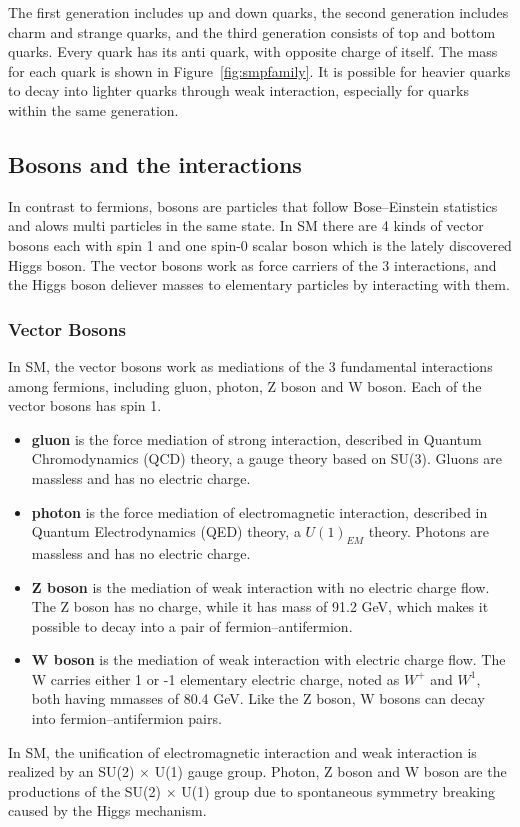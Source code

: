 \vspace{0.3cm}
The first generation includes up and down quarks, the second generation includes charm and strange quarks, and the third generation consists of top and bottom quarks. Every quark has its anti quark, with opposite charge of itself. The mass for each quark is shown in Figure~\ref{fig:smpfamily}. It is possible for heavier quarks to decay into lighter quarks through weak interaction, especially for quarks within the same generation.
\subsection{Bosons and the interactions}
In contrast to fermions, bosons are particles that follow Bose–Einstein statistics and alows multi particles in the same state. In SM there are 4 kinds of vector bosons each with spin 1 and one spin-0 scalar boson which is the lately discovered Higgs boson. The vector bosons work as force carriers of the 3 interactions, and the Higgs boson deliever masses to elementary particles by interacting with them.
\subsubsection{Vector Bosons}
In SM, the vector bosons work as mediations of the 3 fundamental interactions among fermions, including gluon, photon, Z boson and W boson. Each of the vector bosons has spin 1.
\begin{itemize}
\item \textbf{gluon} is the force mediation of strong interaction, described in Quantum Chromodynamics (QCD) theory, a gauge theory based on SU(3). Gluons are massless and has no electric charge.
\item \textbf{photon} is the force mediation of electromagnetic interaction, described in Quantum Electrodynamics (QED) theory, a $U(1)_{EM}$ theory. Photons are massless and has no electric charge.
\item \textbf{Z boson} is the mediation of weak interaction with no electric charge flow. The Z boson has no charge, while it has mass of 91.2 GeV, which makes it possible to decay into a pair of fermion–antifermion.
\item \textbf{W boson} is the mediation of weak interaction with electric charge flow. The W carries either 1 or -1 elementary electric charge, noted as $W^{+}$ and $W^{1}$, both having mmasses of 80.4 GeV. Like the Z boson, W bosons can decay into fermion–antifermion pairs.
\end{itemize}
In SM, the unification of electromagnetic interaction and weak interaction is realized by an SU(2) $\times$ U(1) gauge group. Photon, Z boson and W boson are the productions of the SU(2) $\times$ U(1) group due to spontaneous symmetry breaking caused by the Higgs mechanism. 
